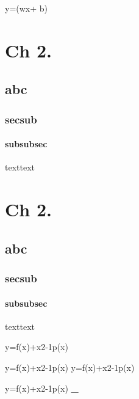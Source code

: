 y=(wx+ b)  

\section{Ch 2.}

\subsection{abc}

\subsubsection{secsub}

\paragraph{subsubsec}

texttext

\section{Ch 2.}

\subsection{abc}

\subsubsection{secsub}

\paragraph{subsubsec}

texttext

y=f(x)+x2-1p(x)

y=f(x)+x2-1p(x) 
y=f(x)+x2-1p(x)



y=f(x)+x2-1p(x) 
\textbf{\_}


 